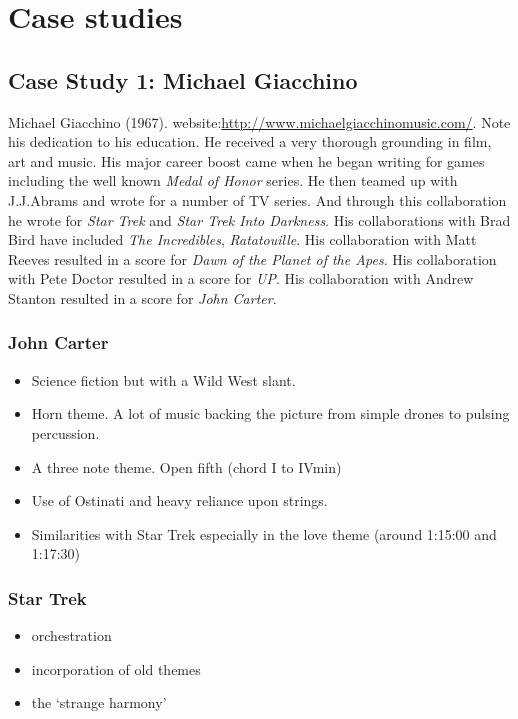 
\chapter{Case studies}
\label{casestudies}

\section{Case Study 1: Michael Giacchino}

Michael Giacchino (1967). website:\url{http://www.michaelgiacchinomusic.com/}. Note his dedication to his education. He received a very thorough grounding in film, art and music. His major career boost came when he began writing for games including the well known \textit{Medal of Honor} series. He then teamed up with J.J.Abrams and wrote for a number of TV series. And through this collaboration he wrote for \textit{Star Trek} and \textit{Star Trek Into Darkness}. His collaborations with Brad Bird have included \textit{The Incredibles}, \textit{Ratatouille}. His collaboration with Matt Reeves resulted in a score for \textit{Dawn of the Planet of the Apes}. His collaboration with Pete Doctor resulted in a score for \textit{UP}. His collaboration with Andrew Stanton resulted in a score for \textit{John Carter}.

\subsection{John Carter}
\begin{itemize}
\item Science fiction but with a Wild West slant.   
\item Horn theme. A lot of music backing the picture from simple drones to pulsing percussion.  
\item A three note theme. Open fifth (chord I to IVmin)
\item Use of Ostinati and heavy reliance upon strings.
\item Similarities with Star Trek especially in the love theme (around 1:15:00 and 1:17:30)
\end{itemize}

\subsection{Star Trek}
\begin{itemize}
\item orchestration
\item incorporation of old themes
\item the `strange harmony'
\end{itemize}


